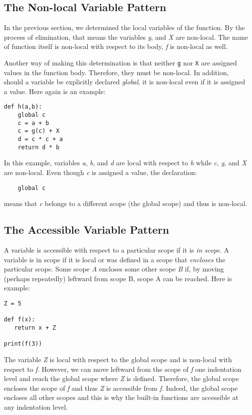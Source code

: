 \subsection{The Non-local Variable Pattern}

In the previous section, we determined the local
variables of the function.
By the process 
of elimination, that means the variables
{\it g}, and {\it X} are non-local.
The name of function itself is non-local with respect
to its body, {\it f} is non-local as well.

Another way of making this determination is
that
neither {\tt g} nor {\tt X} are assigned values
in the function body. Therefore, they must be non-local.
In addition, should a variable be explicitly declared {\it global},
it is non-local even if it is assigned a value.
Here again is an example:

\begin{verbatim}
def h(a,b):
    global c
    c = a + b
    c = g(c) + X
    d = c * c + a
    return d * b
\end{verbatim}

In this example, variables {\it a}, {\it b}, and {\it d} are local with respect
to {\it h} while {\it c}, {\it g}, and {\it X} are non-local.
Even though {\it c} is assigned a value, the declaration:

\begin{verbatim}
    global c
\end{verbatim}

means that {\it c} belongs to a different scope (the global scope) and thus
is non-local.

\subsection{The Accessible Variable Pattern}

A variable is accessible with respect to
a particular scope if it is {\it in scope}.
A variable is in scope if it is local or
was defined in a scope that
{\it encloses} the particular scope.
Some scope
{\it A} encloses some other scope {\it B}
if, by moving (perhaps repeatedly) leftward from
scope B, scope A can be reached.
Here is example:

\begin{verbatim}
Z = 5

def f(x):
   return x + Z

print(f(3))
\end{verbatim}

The variable {\it Z} is local with respect to the global scope
and is non-local with respect to {\it f}. However, we can
move leftward from the scope of {\it f} one indentation level and
reach the global scope where {\it Z} is defined.
Therefore, the global scope encloses the scope of {\it f} and
thus {\it Z} is accessible from {\it f}.
Indeed, the global scope encloses all other scopes and this
is why the built-in functions are accessible at any indentation
level.

